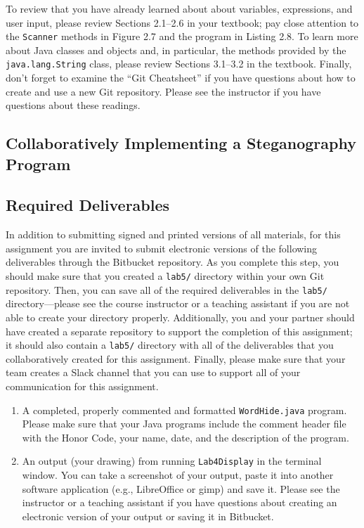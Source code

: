 To review that you have already learned about about variables, expressions, and user input, please review Sections
2.1--2.6 in your textbook; pay close attention to the {\tt Scanner} methods in Figure 2.7 and the program in Listing
2.8. To learn more about Java classes and objects and, in particular, the methods provided by the {\tt java.lang.String}
class, please review Sections 3.1--3.2 in the textbook. Finally, don't forget to examine the ``Git Cheatsheet'' if you
have questions about how to create and use a new Git repository. Please see the instructor if you have questions
about these readings.

\subsection*{Collaboratively Implementing a Steganography Program}
\vspace{-0.05in}

\vspace*{-.1in}
\subsection*{Required Deliverables}

In addition to submitting signed and printed versions of all materials, for this assignment you are invited to submit
electronic versions of the following deliverables through the Bitbucket repository. As you complete this step, you
should make sure that you created a {\tt lab5/} directory within your own Git repository.  Then, you can save all of the
required deliverables in the {\tt lab5/} directory---please see the course instructor or a teaching assistant if you are
not able to create your directory properly. Additionally, you and your partner should have created a separate repository
to support the completion of this assignment; it should also contain a {\tt lab5/} directory with all of the
deliverables that you collaboratively created for this assignment. Finally, please make sure that your team creates a
Slack channel that you can use to support all of your communication for this assignment.

\begin{enumerate}

        \item A completed, properly commented and formatted {\tt WordHide.java} program. Please make sure that your Java
          programs include the comment header file with the Honor Code, your name, date, and the description of the
          program.

        \item An output (your drawing) from running {\tt Lab4Display} in the terminal window. You can take a screenshot
          of your output, paste it into another software application (e.g., LibreOffice or gimp) and save it. Please see
          the instructor or a teaching assistant if you have questions about creating an electronic version of your
          output or saving it in Bitbucket.

\end{enumerate}


